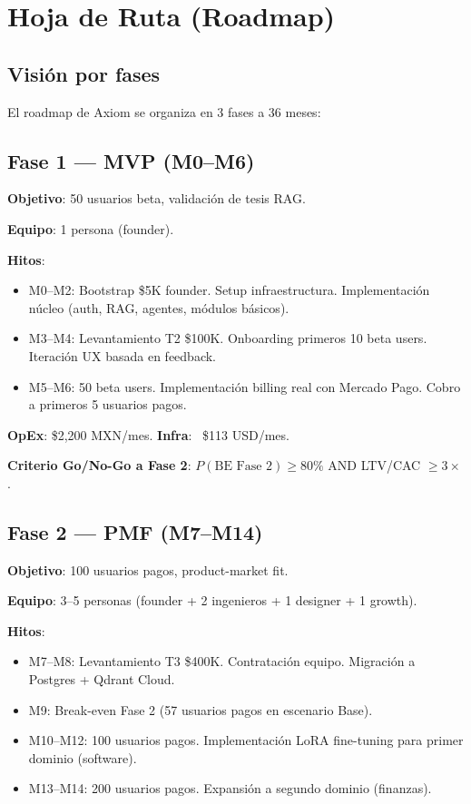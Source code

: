 \documentclass[10pt,a4paper,oneside]{report}
\begin{document}
\chapter{Hoja de Ruta (Roadmap)}

\section{Visión por fases}
El roadmap de Axiom se organiza en 3 fases a 36 meses:

\section{Fase 1 — MVP (M0--M6)}
\textbf{Objetivo}: 50 usuarios beta, validación de tesis RAG.

\textbf{Equipo}: 1 persona (founder).

\textbf{Hitos}:
\begin{itemize}[leftmargin=1.4em]
\item M0--M2: Bootstrap \$5K founder. Setup infraestructura. Implementación núcleo (auth, RAG, agentes, módulos básicos).
\item M3--M4: Levantamiento T2 \$100K. Onboarding primeros 10 beta users. Iteración UX basada en feedback.
\item M5--M6: 50 beta users. Implementación billing real con Mercado Pago. Cobro a primeros 5 usuarios pagos.
\end{itemize}

\textbf{OpEx}: \$2,200 MXN/mes. \textbf{Infra}: ~\$113 USD/mes.

\textbf{Criterio Go/No-Go a Fase 2}: $P(\text{BE Fase 2}) \geq 80\%$ AND LTV/CAC $\geq 3\times$.

\section{Fase 2 — PMF (M7--M14)}
\textbf{Objetivo}: 100 usuarios pagos, product-market fit.

\textbf{Equipo}: 3--5 personas (founder + 2 ingenieros + 1 designer + 1 growth).

\textbf{Hitos}:
\begin{itemize}[leftmargin=1.4em]
\item M7--M8: Levantamiento T3 \$400K. Contratación equipo. Migración a Postgres + Qdrant Cloud.
\item M9: Break-even Fase 2 (57 usuarios pagos en escenario Base).
\item M10--M12: 100 usuarios pagos. Implementación LoRA fine-tuning para primer dominio (software).
\item M13--M14: 200 usuarios pagos. Expansión a segundo dominio (finanzas).
\end{itemize}
\end{document}
